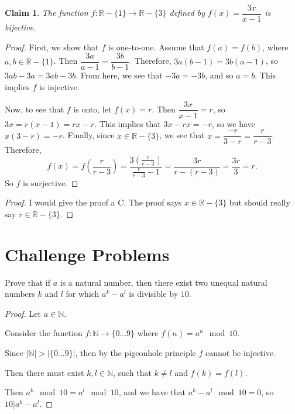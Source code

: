 \documentclass[12 pt]{exam}
\newtheorem{claim}{Claim}
\begin{document}
\begin{questions}
\begin{claim} The function $f:\mathbb{R}-\{1\} \rightarrow \mathbb{R}-\{3\}$ defined by $f(x)=\dfrac{3x}{x-1}$ is bijective. \end{claim}
 \begin{proof} 
 	First, we show that $f$ is one-to-one. Assume that $f(a)=f(b)$, where $a,b \in \mathbb{R}-\{1\}$. Then $\dfrac{3a}{a-1}=\dfrac{3b}{b-1}.$ Therefore, $3a(b-1)=3b(a-1)$, so $3ab-3a=3ab-3b$. From here, we see that $-3a=-3b$, and so $a=b$. This implies $f$ is injective.
	
	Now, to see that $f$ is onto, let $f(x)=r$. Then $\dfrac{3x}{x-1}=r$, so $3x=r(x-1)=rx-r.$ This implies that $3x-rx=-r$, so we have $x(3-r)=-r$. Finally, since $x\in \mathbb{R}-\{3\}$, we see that $x=\dfrac{-r}{3-r}=\dfrac{r}{r-3}$. Therefore, $$f(x)=f\left(\frac{r}{r-3}\right)=\frac{3\left(\frac{r}{r-3}\right)}{\frac{r}{r-3}-1}=\frac{3r}{r-(r-3)}=\frac{3r}{3}=r.$$ So $f$ is surjective.
 \end{proof}

\begin{solution}\begin{proof}
I would give the proof a C. The proof says $x \in \mathbb{R}-\{3\}$ but should really say
$r \in \mathbb{R}-\{3\}$.
\end{proof}\end{solution}

 
 
 \newpage
 
\section*{Challenge Problems} 
\question Prove that if $a$ is a natural number, then there exist two unequal natural numbers $k$ and $l$ for which $a^k-a^l$ is divisible by $10.$

\begin{solution}\begin{proof}
Let $a \in \mathbb{N}$.

Consider the function $f: \mathbb{N} \to \{0...9\}$ where $f(n) = a^n \mod 10$.

Since $|\mathbb{N}| > |\{0...9\}|$, then by the pigeonhole principle $f$ cannot be injective.

Then there must exist $k, l \in \mathbb{N}$, such that $k \ne l$ and $f(k) = f(l)$.

Then $a^k \mod 10 = a^l \mod 10$, and we have that $a^k - a^l \mod 10 = 0$, so $10 | a^k - a^l$.


\end{proof}
\end{solution}
\end{questions}
\end{document}
